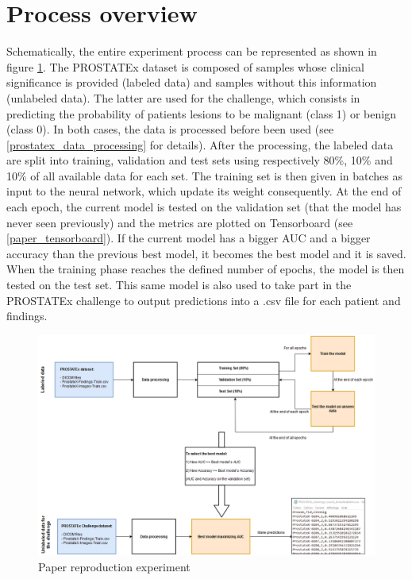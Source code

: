 \section{Process overview}
Schematically, the entire experiment process can be represented as shown in figure \ref{fig:paper_reproduction_process}. The PROSTATEx dataset is composed of samples whose clinical significance is provided (labeled data) and samples without this information (unlabeled data). The latter are used for the challenge, which consists in predicting the probability of patients lesions to be malignant (class 1) or benign (class 0). In both cases, the data is processed before been used (see \ref{prostatex_data_processing} for details). After the processing, the labeled data are split into training, validation and test sets using respectively 80\%, 10\% and 10\% of all available data for each set. The training set is then given in batches as input to the neural network, which update its weight consequently. At the end of each epoch, the current model is tested on the validation set (that the model has never seen previously) and the metrics are plotted on Tensorboard (see \ref{paper_tensorboard}). If the current model has a bigger AUC and a bigger accuracy than the previous best model, it becomes the best model and it is saved.  When the training phase reaches the defined number of epochs, the model is then tested on the test set. This same model is also used to take part in the PROSTATEx challenge to output predictions into a .csv file for each patient and findings.

\begin{figure}[!h]
\centering
\includegraphics[width=1\textwidth, keepaspectratio=true]{./figures/paper_reproduction_process.png}
\caption{Paper reproduction experiment}
\label{fig:paper_reproduction_process}
\end{figure}


